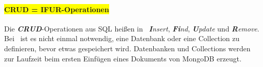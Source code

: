 \paragraph{\colorbox{yellow}{CRUD = IFUR-Operationen}\label{ifur}}
Die \textit{\textbf{CRUD}}-Operationen aus SQL heißen in \mongo\ \textit{\textbf{I}nsert}, \textit{\textbf{Fi}nd}, \textit{\textbf{U}pdate} und \textit{\textbf{R}emove}. Bei \mongo\ ist es nicht einmal notwendig, eine Datenbank oder eine Collection zu definieren, bevor etwas gespeichert wird. Datenbanken und Collections werden zur Laufzeit beim ersten Einfügen eines Dokuments von MongoDB erzeugt.

